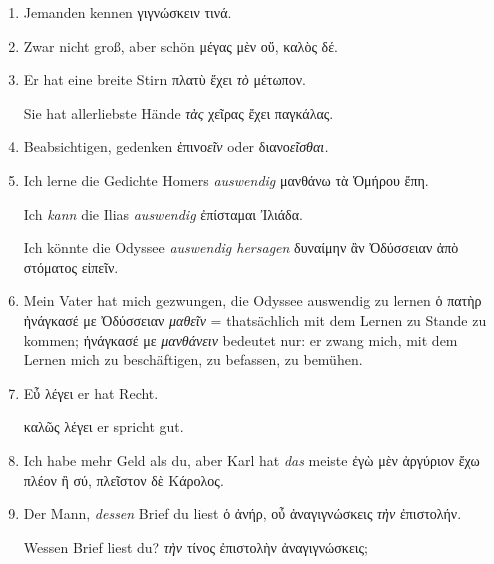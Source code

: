 \begin{enumerate}[leftmargin=0pt,rightmargin=0pt,listparindent =1cm,labelindent=1cm,labelsep=1ex,labelwidth={*},itemindent={*},align=left]
\item Jemanden kennen \textgreek[variant=ancient]{γιγνώσκειν τινά.}
\item Zwar nicht groß, aber schön \textgreek[variant=ancient]{μέγας μὲν
οὔ, καλὸς δέ.}
\item Er hat eine breite Stirn \textgreek[variant=ancient]{πλατὺ ἔχει \emph{τὸ}
μέτωπον.}


Sie hat allerliebste Hände \textgreek[variant=ancient]{\emph{τὰς}
χεῖρας ἔχει παγκάλας.}

\item Beabsichtigen, gedenken \textgreek[variant=ancient]{ἐπινο\emph{εῖν}}
oder \textgreek[variant=ancient]{διανο\emph{εῖσθαι.}}
\item Ich lerne die Gedichte Homers \emph{auswendig} \textgreek[variant=ancient]{μανθάνω
τὰ Ὁμήρου ἔπη.}


\begin{continuousitemline}Ich \emph{kann} die Ilias \emph{auswendig}
\textgreek[variant=ancient]{ἐπίσταμαι Ἰλιάδα.}


Ich könnte die Odyssee \emph{auswendig hersagen} \textgreek[variant=ancient]{δυναίμην
ἂν Ὀδύσσειαν ἀπὸ στόματος εἰπεῖν. }\par\end{continuousitemline}

\item Mein Vater hat mich gezwungen, die Odyssee auswendig zu lernen \textgreek[variant=ancient]{ὁ
πατὴρ ἠνάγκασέ με Ὀδύσσειαν \emph{μαθεῖν}} = that\textcompwordmark{}sächlich
mit dem Lernen zu Stande zu kommen; \textgreek[variant=ancient]{ἠνάγκασέ
με \emph{μανθάνειν}} bedeutet nur: er zwang mich, mit dem Lernen mich
zu beschäftigen, zu befassen, zu bemühen. 
\item \textgreek[variant=ancient]{Εὖ λέγει }er hat Recht.


\begin{continuousitemline}\textgreek[variant=ancient]{καλῶς λέγει}
er spricht gut.\par\end{continuousitemline}

\item Ich habe mehr Geld als du, aber Karl hat \emph{das} meiste \textgreek[variant=ancient]{ἐγὼ
μὲν ἀργύριον ἔχω πλέον ἢ σύ, πλεῖστον δὲ Κάρολος.}
\item Der Mann, \emph{dessen} Brief du liest \textgreek[variant=ancient]{ὁ
ἀνήρ, οὖ ἀναγιγνώσκεις \emph{τὴν} ἐπιστολήν.}


\begin{continuousitemline}Wessen Brief liest du? \textgreek[variant=ancient]{\emph{τὴν}
τίνος ἐπιστολὴν ἀναγιγνώσκεις;}\par\end{continuousitemline}


\end{enumerate}
